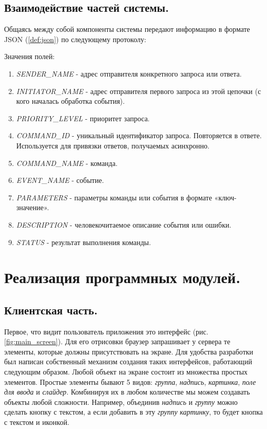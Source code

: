 \subsection{Взаимодействие частей системы.}

Общаясь между собой компоненты системы передают информацию в формате JSON (\ref{def:json}) по следующему протоколу:


Значения полей:
\begin{enumerate}
    \item \textit{SENDER\_NAME} - адрес отправителя конкретного запроса или ответа.
    \item \textit{INITIATOR\_NAME} - адрес отправителя первого запроса из этой цепочки (с кого началась обработка события).
    \item \textit{PRIORITY\_LEVEL} - приоритет запроса.
    \item \textit{COMMAND\_ID} - уникальный идентификатор запроса. Повторяется в ответе.
    Используется для привязки ответов, получаемых асинхронно.
    \item \textit{COMMAND\_NAME} - команда.
    \item \textit{EVENT\_NAME} - событие.
    \item \textit{PARAMETERS} - параметры команды или события в формате «ключ-значение».
    \item \textit{DESCRIPTION} - человекочитаемое описание события или ошибки.
    \item \textit{STATUS} - результат выполнения команды.
\end{enumerate}

\clearpage

\section{Реализация программных модулей.}

\subsection{Клиентская часть.}

Первое, что видит пользователь приложения это интерфейс (рис. \ref{fig:main_screen}). Для его отрисовки браузер запрашивает
у сервера те элементы, которые должны присутствовать на экране. Для удобства разработки был написан собственный механизм
создания таких интерфейсов, работающий следующим образом. Любой объект на экране состоит из множества простых элементов.
Простые элементы бывают 5 видов: \textit{группа}, \textit{надпись}, \textit{картинка}, \textit{поле для ввода} и
\textit{слайдер}. Комбинируя их в любом количестве мы можем создавать объекты любой сложности. Например, объединив
\textit{надпись} и \textit{группу} можно сделать кнопку с текстом, а если добавить в эту \textit{группу} \textit{картинку},
то будет кнопка с текстом и иконкой.

